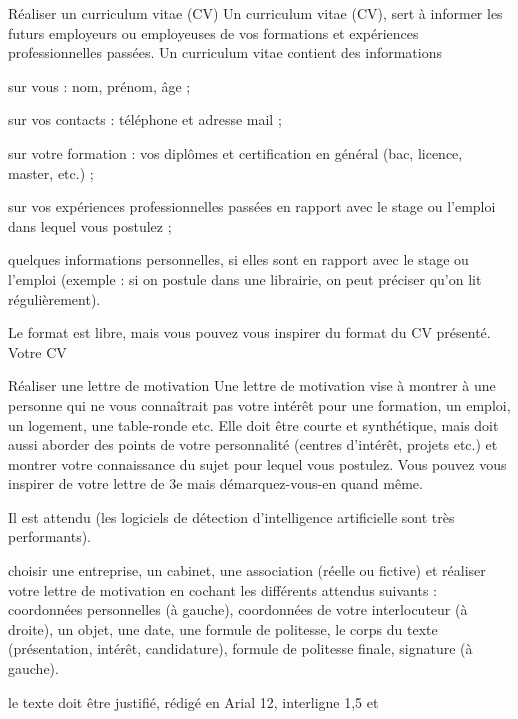 \begin{doc}{Réaliser un curriculum vitae (CV)}
  Un curriculum vitae (CV), sert à informer les futurs employeurs ou employeuses de vos formations et expériences professionnelles passées. 
  Un curriculum vitae contient des informations 
  \begin{listePoints}
    \item sur vous : nom, prénom, âge ;
    \item sur vos contacts : téléphone et adresse mail ;
    \item sur votre formation : vos diplômes et certification en général (bac, licence, master, etc.) ;
    \item sur vos expériences professionnelles passées en rapport avec le stage ou l'emploi dans lequel vous postulez ;
    \item quelques informations personnelles, si elles sont en rapport avec le stage ou l'emploi (exemple : si on postule dans une librairie, on peut préciser qu'on lit régulièrement).
  \end{listePoints}
  Le format est libre, mais vous pouvez vous inspirer du format du CV présenté. Votre CV 
\end{doc}

\begin{doc}{Réaliser une lettre de motivation}
  Une lettre de motivation vise à montrer à une personne qui ne vous connaîtrait pas votre intérêt pour une formation, un emploi, un logement, une table-ronde etc. Elle doit être courte et synthétique, mais doit aussi aborder des points de votre personnalité (centres d’intérêt, projets etc.) et montrer votre connaissance du sujet pour lequel vous postulez. Vous pouvez vous inspirer de votre lettre de 3e mais démarquez-vous-en quand même.
  
  Il est attendu  (les logiciels de détection d’intelligence artificielle sont très performants).
  \begin{listePoints}
    \item {} choisir une entreprise, un cabinet, une association (réelle ou fictive) et réaliser votre lettre de motivation en cochant les différents attendus suivants : coordonnées personnelles (à gauche), coordonnées de votre interlocuteur (à droite), un objet, une date, une formule de politesse, le corps du texte (présentation, intérêt, candidature), formule de politesse finale, signature (à gauche).
    \item {} le texte doit être justifié, rédigé en Arial 12, interligne 1,5 et  
  \end{listePoints}
\end{doc}


